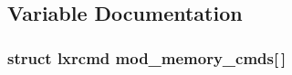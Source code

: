 \subsection{Variable Documentation}
\hypertarget{memory-util-bak_8c_a2cf116839ba2fdb2d9fed443b032d1ca}{
\subsubsection[{mod\+\_\+memory\+\_\+cmds}]{\setlength{\rightskip}{0pt plus 5cm}struct lxrcmd mod\+\_\+memory\+\_\+cmds\mbox{[}$\,$\mbox{]}}}\label{memory-util-bak_8c_a2cf116839ba2fdb2d9fed443b032d1ca}
